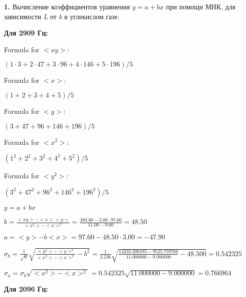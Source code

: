\documentclass[12pt,a4paper]{article}
\begin{document}
\textbf{1.} Вычисление коэффициентов уравнения $y = a + bx$ при помощи МНК, для зависимости \textit{L} от \textit{k} в углекислом газе.

\textbf{Для 2909 Гц:}

\vspace{0.5cm}

Formula for $<xy>:$
\vspace{0.5cm}

$(1 \cdot 3 + 2 \cdot 47 + 3 \cdot 96 + 4 \cdot 146 + 5 \cdot 196) / 5$
\vspace{0.5cm}

Formula for $<x>:$
\vspace{0.5cm}

$(1 + 2 + 3 + 4 + 5) / 5$
\vspace{0.5cm}

Formula for $<y>:$
\vspace{0.5cm}

$(3 + 47 + 96 + 146 + 196) / 5$
\vspace{0.5cm}

Formula for $<x^2>$:
\vspace{0.5cm}

$(1^2 + 2^2 + 3^2 + 4^2 + 5^2) / 5$
\vspace{0.5cm}

Formula for $<y^2>:$
\vspace{0.5cm}

$(3^2 + 47^2 + 96^2 + 146^2 + 196^2) / 5$
\vspace{0.5cm}



$y = a + bx$
\vspace{0.5cm}

$b = \frac{<xy> - <x><y>}{<x^2> - <x>^2} = \frac{389.80 - 3.00 \cdot 97.60}{11.00 - 9.00} = 48.50$
\vspace{0.5cm}

$a =<y> - b <x> = 97.60 - 48.50 \cdot 3.00 = -47.90$
\vspace{0.5cm}

$\sigma_b = \frac{1}{\sqrt{n}} \sqrt { \frac{<y^2> - <y>^2}{<x^2> - <x>^2}  - b^2} = \frac{1}{2.236} \sqrt {\frac{14233.200195 - 9525.759766}{11.000000 - 9.000000} - 48.500} = 0.542325$
\vspace{0.5cm}

$\sigma_a = \sigma_b \sqrt{<x^2> - <x>^2} = 0.542325 \sqrt{11.000000 - 9.000000} = 0.766964$

\textbf{Для 2096 Гц:}

\vspace{0.5cm}
\end{document}
